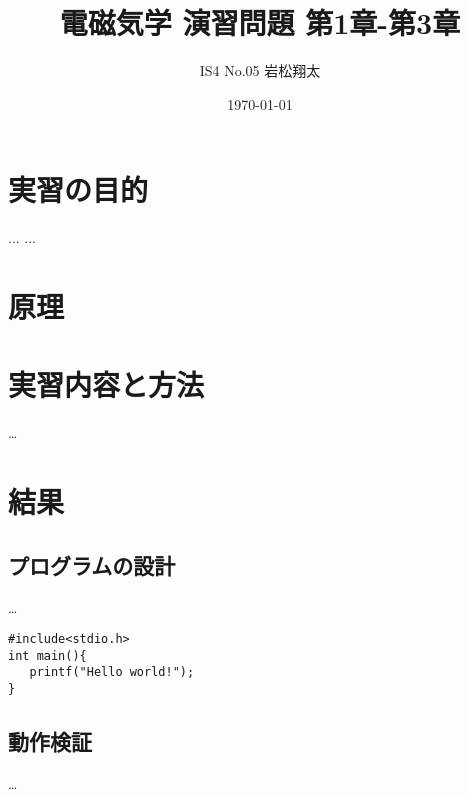 \documentclass[11pt,a4paper]{jsarticle}
\title{電磁気学 演習問題 第1章-第3章}
\author{IS4 No.05 岩松翔太}
\date{\today}
\begin{document}
\maketitle
\newpage %
\section{実習の目的}
...
...
\section{原理}

\section{実習内容と方法}
…
\section{結果}
\subsection{プログラムの設計}
…

\begin{lstlisting}[caption=hoge,label=fuga]
#include<stdio.h>
int main(){
   printf("Hello world!");
}
\end{lstlisting}

\subsection{動作検証}
…
\end{document}
